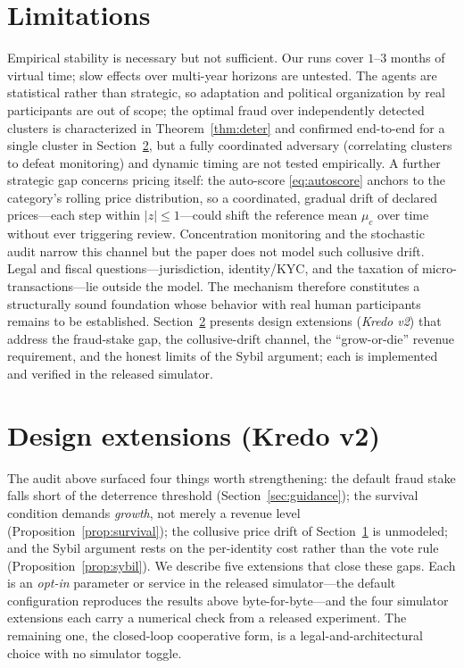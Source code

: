 \documentclass[11pt]{article}
\theoremstyle{plain}
\theoremstyle{definition}
\theoremstyle{remark}
\begin{document}
\section{Limitations}\label{sec:limitations}

Empirical stability is necessary but not sufficient. Our runs cover $1$--$3$ months of virtual time; slow effects over multi-year horizons are untested. The agents are statistical rather than strategic, so adaptation and political organization by real participants are out of scope; the optimal fraud over independently detected clusters is characterized in Theorem~\ref{thm:deter} and confirmed end-to-end for a single cluster in Section~\ref{sec:extensions}, but a fully coordinated adversary (correlating clusters to defeat monitoring) and dynamic timing are not tested empirically. A further strategic gap concerns pricing itself: the auto-score \eqref{eq:autoscore} anchors to the category's rolling price distribution, so a coordinated, gradual drift of declared prices---each step within $|z|\le1$---could shift the reference mean $\mu_c$ over time without ever triggering review. Concentration monitoring and the stochastic audit narrow this channel but the paper does not model such collusive drift. Legal and fiscal questions---jurisdiction, identity/KYC, and the taxation of micro-transactions---lie outside the model. The mechanism therefore constitutes a structurally sound foundation whose behavior with real human participants remains to be established. Section~\ref{sec:extensions} presents design extensions (\emph{Kredo v2}) that address the fraud-stake gap, the collusive-drift channel, the ``grow-or-die'' revenue requirement, and the honest limits of the Sybil argument; each is implemented and verified in the released simulator.

\section{Design extensions (Kredo v2)}\label{sec:extensions}

The audit above surfaced four things worth strengthening: the default fraud stake falls short of the deterrence threshold (Section~\ref{sec:guidance}); the survival condition demands \emph{growth}, not merely a revenue level (Proposition~\ref{prop:survival}); the collusive price drift of Section~\ref{sec:limitations} is unmodeled; and the Sybil argument rests on the per-identity cost rather than the vote rule (Proposition~\ref{prop:sybil}). We describe five extensions that close these gaps. Each is an \emph{opt-in} parameter or service in the released simulator---the default configuration reproduces the results above byte-for-byte---and the four simulator extensions each carry a numerical check from a released experiment. The remaining one, the closed-loop cooperative form, is a legal-and-architectural choice with no simulator toggle.
\end{document}
